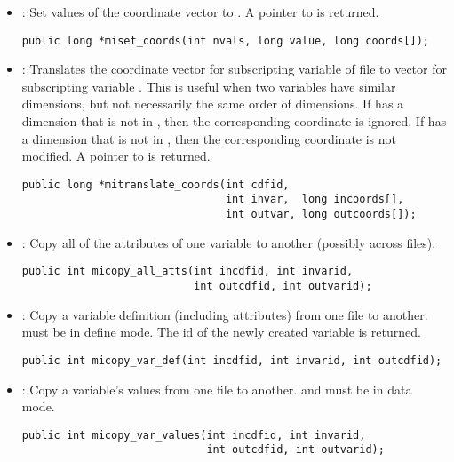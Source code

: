 \begin{itemize}
\item {} : Set  values of the coordinate
vector  to . A pointer to  is
returned.
\begin{verbatim}
public long *miset_coords(int nvals, long value, long coords[]);
\end{verbatim}

\item {} : Translates the coordinate vector
 for subscripting variable  of file
 to vector  for subscripting variable
. This is useful when two variables have similar
dimensions, but not necessarily the same order of dimensions. If
 has a dimension that is not in , then the
corresponding coordinate is ignored. If  has a dimension
that is not in , then the corresponding coordinate is not
modified. A pointer to  is returned.
\begin{verbatim}
public long *mitranslate_coords(int cdfid, 
                                int invar,  long incoords[],
                                int outvar, long outcoords[]);
\end{verbatim}

\item {} : Copy all of the attributes of one
variable to another (possibly across files).
\begin{verbatim}
public int micopy_all_atts(int incdfid, int invarid, 
                           int outcdfid, int outvarid);
\end{verbatim}

\item {} : Copy a variable definition (including
attributes) from one file to another.  must be in
define mode. The id of the newly created variable is returned.
\begin{verbatim}
public int micopy_var_def(int incdfid, int invarid, int outcdfid);
\end{verbatim}

\item {} : Copy a variable's values from one
file to another.  and  must be in data
mode.
\begin{verbatim}
public int micopy_var_values(int incdfid, int invarid, 
                             int outcdfid, int outvarid);
\end{verbatim}


\end{itemize}

